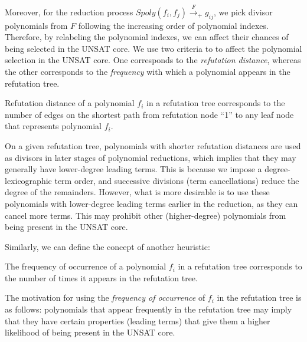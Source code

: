 Moreover, for the reduction process
$Spoly(f_i,f_j)\xrightarrow{F}_+g_{ij}$, we pick divisor polynomials from
$F$ following the increasing order of polynomial indexes. Therefore,
by relabeling the polynomial indexes, we can affect their
chances of being selected in the UNSAT core. We use two criteria to
to affect the polynomial selection in the UNSAT core. One corresponds
to the \emph{refutation distance}, whereas the other corresponds to
the {\it frequency} with which a polynomial appears in the refutation
tree.  

\begin{Definition}
Refutation distance of a polynomial $f_i$ in a refutation tree
corresponds to the number of edges on the shortest path from refutation
node ``1'' to any leaf node that represents polynomial $f_i$. 
\end{Definition}

On a given refutation tree, polynomials with shorter refutation
distances are used as divisors in later stages of polynomial
reductions, which implies that they may generally have lower-degree
leading terms. This is because we impose a degree-lexicographic term
order, and successive divisions (term cancellations) reduce the degree
of the remainders. However, what is more desirable is to use these
polynomials with lower-degree leading terms earlier in the reduction,
as they can cancel more terms. This may prohibit other (higher-degree)
polynomials from being present in the UNSAT core. 



Similarly, we can define the concept of another heuristic:
\begin{Definition}
The frequency of occurrence of a polynomial $f_i$ in a refutation tree
corresponds to the number of times it appears in the refutation tree. 
\end{Definition}

The motivation for using the \emph{frequency of occurrence}
of $f_i$ in the refutation tree is as follows: polynomials that appear
frequently in the refutation tree may imply that they have certain
properties (leading terms) that give them a higher likelihood of being
present in the UNSAT core. 

